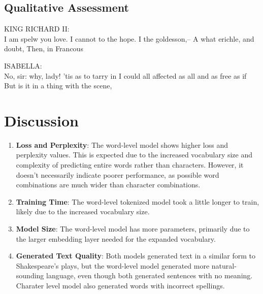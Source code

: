 \documentclass[fontsize=10pt]{article}
\begin{document}
\subsection{Qualitative Assessment}
\vspace{-10pt}
\begin{multicols}{2}

  
  \begin{tcolorbox}[title=Character-Level (ReLU) generated text:]
  \ttfamily %
  KING RICHARD II:\\
I am spelw you love.
I cannot to the hope.
I the goldesson,--
A what erichle, and doubt, Then, in Francous
  \end{tcolorbox}
  
  \columnbreak
  
  \begin{tcolorbox}[title=Word-Level (GeLU) generated text:]
  \ttfamily %
  ISABELLA: \\
 No, sir: why, lady! 'tis as to tarry in 
 I could all affected as all and as free as if 
 But is it in a thing with the scene, 
  \end{tcolorbox}
  
  \end{multicols}
  \vspace{-25pt}
\section{Discussion}
\vspace{-10pt}
\begin{enumerate}
    \item \textbf{Loss and Perplexity}: The word-level model shows higher loss and perplexity values. This is expected due to the increased vocabulary size and complexity of predicting entire words rather than characters. However, it doesn't necessarily indicate poorer performance, as possible word combinations are much wider than character combinations.

    \item \textbf{Training Time}: The word-level tokenized model took a little longer to train, likely due to the increased vocabulary size.

    \item \textbf{Model Size}: The word-level model has more parameters, primarily due to the larger embedding layer needed for the expanded vocabulary.

    \item \textbf{Generated Text Quality}: Both models generated text in a similar form to Shakespeare's plays, but the word-level model generated more natural-sounding language, even though both generated sentences with no meaning. Charater level model also generated words with incorrect spellings.
\end{enumerate}
\vspace{-10pt}
\end{document}
